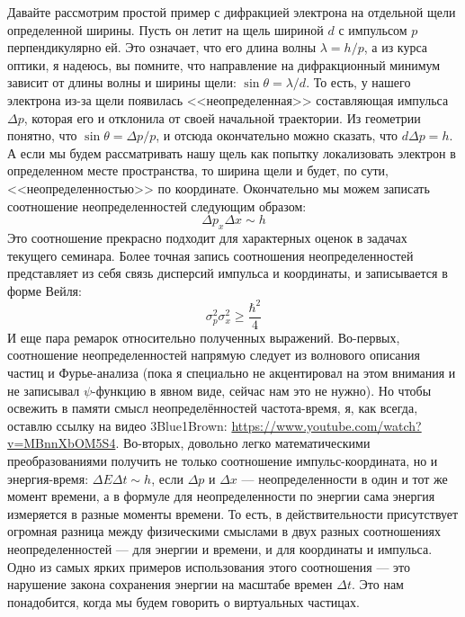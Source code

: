 \documentclass[12pt]{article}
\begin{document}
Давайте рассмотрим простой пример с дифракцией электрона на отдельной щели определенной ширины. Пусть он летит на щель шириной $d$ с импульсом $p$ перпендикулярно ей. Это означает, что его длина волны $\lambda = h/p$, а из курса оптики, я надеюсь, вы помните, что направление на дифракционный минимум зависит от длины волны и ширины щели: $\sin{\theta} = \lambda/d$. То есть, у нашего электрона из-за щели появилась <<неопределенная>> составляющая импульса $\Delta p$, которая его и отклонила от своей начальной траектории. Из геометрии понятно, что $\sin{\theta} = \Delta p / p$, и отсюда окончательно можно сказать, что $d\Delta p = h$. А если мы будем рассматривать нашу щель как попытку локализовать электрон в определенном месте пространства, то ширина щели и будет, по сути, <<неопределенностью>> по координате. Окончательно мы можем записать соотношение неопределенностей следующим образом:
\begin{equation}
    \Delta p_x \Delta x \sim h
\end{equation}
Это соотношение прекрасно подходит для характерных оценок в задачах текущего семинара. Более точная запись соотношения неопределенностей представляет из себя связь дисперсий импульса и координаты, и записывается в форме Вейля:
\begin{equation*}
    \sigma^2_p \sigma^2_x \ge \dfrac{\hbar^2}{4}
\end{equation*}
И еще пара ремарок относительно полученных выражений. Во-первых, соотношение неопределенностей напрямую следует из волнового описания частиц и Фурье-анализа (пока я специально не акцентировал на этом внимания и не записывал $\psi$-функцию в явном виде, сейчас нам это не нужно). Но чтобы освежить в памяти смысл неопределённостей частота-время, я, как всегда, оставлю ссылку на видео 3Blue1Brown: \url{https://www.youtube.com/watch?v=MBnnXbOM5S4}. Во-вторых, довольно легко математическими преобразованиями получить не только соотношение импульс-координата, но и энергия-время: $\Delta E \Delta t \sim h$, если $\Delta p$ и $\Delta x$ --- неопределенности в один и тот же момент времени, а в формуле для неопределенности по энергии сама энергия измеряется в разные моменты времени. То есть, в действительности присутствует огромная разница между физическими смыслами в двух разных соотношениях неопределенностей --- для энергии и времени, и для
координаты и импульса. Одно из самых ярких примеров использования этого соотношения --- это нарушение закона сохранения энергии на масштабе времен $\Delta t$. Это нам понадобится, когда мы будем говорить о виртуальных частицах.
\end{document}
